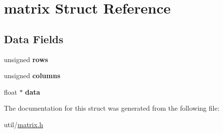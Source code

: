 \hypertarget{structmatrix}{}\section{matrix Struct Reference}
\label{structmatrix}
\subsection*{Data Fields}
\begin{DoxyCompactItemize}
\item 
\mbox{\label{structmatrix_ae8233ee9da9814d9c712a855f882d95e}} 
unsigned {\bfseries rows}
\item 
\mbox{\label{structmatrix_ae8349789b2a17e41e61df5a47481b76d}} 
unsigned {\bfseries columns}
\item 
\mbox{\label{structmatrix_a130b05d829c7f46ee353df0c466bbcb1}} 
float $\ast$ {\bfseries data}
\end{DoxyCompactItemize}


The documentation for this struct was generated from the following file\+:\begin{DoxyCompactItemize}
\item 
util/\hyperlink{matrix_8h}{matrix.\+h}\end{DoxyCompactItemize}
